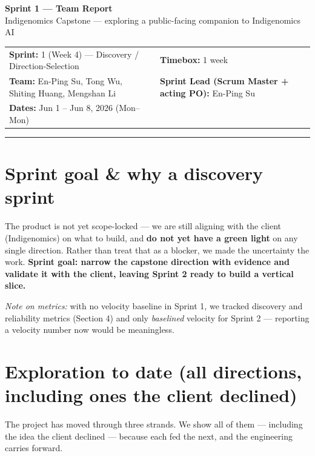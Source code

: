 \documentclass[11pt]{article}
\begin{document}
\begin{center}
{\Large\bfseries Sprint 1 --- Team Report}\\[3pt]
{\normalsize Indigenomics Capstone --- exploring a public-facing companion to Indigenomics AI}
\end{center}

\vspace{2pt}
\noindent\begin{tabular}{@{}p{}p{}@{}}
\textbf{Sprint:} 1 (Week 4) --- Discovery / Direction-Selection & \textbf{Timebox:} 1 week \\
\textbf{Team:} En-Ping Su, Tong Wu, Shiting Huang, Mengshan Li & \textbf{Sprint Lead (Scrum Master + acting PO):} En-Ping Su \\
\textbf{Dates:} Jun 1 -- Jun 8, 2026 (Mon--Mon) & \\
\end{tabular}

\hrule
\vspace{2pt}

\section{Sprint goal \& why a discovery sprint}
The product is not yet scope-locked --- we are still aligning with the client (Indigenomics) on what to build, and \textbf{do not yet have a green light} on any single direction. Rather than treat that as a blocker, we made the uncertainty the work. \textbf{Sprint goal: narrow the capstone direction with evidence and validate it with the client, leaving Sprint 2 ready to build a vertical slice.}

\textit{Note on metrics:} with no velocity baseline in Sprint 1, we tracked discovery and reliability metrics (Section 4) and only \emph{baselined} velocity for Sprint 2 --- reporting a velocity number now would be meaningless.

\section{Exploration to date (all directions, including ones the client declined)}
The project has moved through three strands. We show all of them --- including the idea the client declined --- because each fed the next, and the engineering carries forward.
\end{document}
